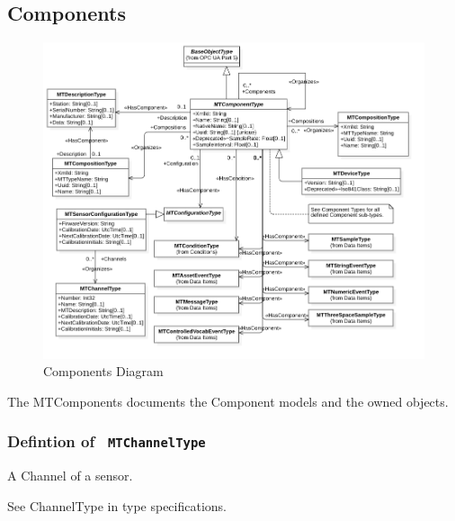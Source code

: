 \subsection{Components} \label{model:Components}

\begin{figure}[ht]
  \centering
    \includegraphics[width=1.0\textwidth]{./diagrams/types/Components.png}
  \caption{Components Diagram}
  \label{fig:Components}
\end{figure}

\FloatBarrier


The \glspl{MTComponent} documents the Component models and the owned objects.

\subsubsection{Defintion of \texttt{ MTChannelType}}
  \label{type:MTChannelType}

\FloatBarrier

A Channel of a sensor.

See ChannelType in type specifications.



